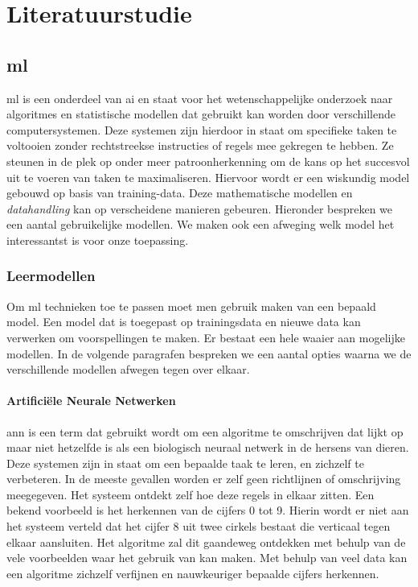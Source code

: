 \chapter{Literatuurstudie}

\section{\gls{ml}}
\gls{ml} is een onderdeel van \gls{ai} en staat voor het wetenschappelijke onderzoek naar algoritmes en statistische modellen dat gebruikt kan worden door verschillende computersystemen. Deze systemen zijn hierdoor in staat om specifieke taken te voltooien zonder rechtstreekse instructies of regels mee gekregen te hebben. Ze steunen in de plek op onder meer patroonherkenning om de kans op het succesvol uit te voeren van taken te maximaliseren. Hiervoor wordt er een wiskundig model gebouwd op basis van training-data. Deze mathematische modellen en \textit{datahandling} kan op verscheidene manieren gebeuren. Hieronder bespreken we een aantal gebruikelijke modellen. We maken ook een afweging welk model het interessantst is voor onze toepassing. 

\subsection{Leermodellen}
Om \gls{ml} technieken toe te passen moet men gebruik maken van een bepaald model. Een model dat is toegepast op trainingsdata en nieuwe data kan verwerken om voorspellingen te maken. Er bestaat een hele waaier aan mogelijke modellen. In de volgende paragrafen bespreken we een aantal opties waarna we de verschillende modellen afwegen tegen over elkaar.

	\subsubsection{Artifici\"ele Neurale Netwerken}
	\gls{ann} is een term dat gebruikt wordt om een algoritme te omschrijven dat lijkt op maar niet hetzelfde is als een biologisch neuraal netwerk in de hersens van dieren. Deze systemen zijn in staat om een bepaalde taak te leren, en zichzelf te verbeteren. In de meeste gevallen worden er zelf geen richtlijnen of omschrijving meegegeven. Het systeem ontdekt zelf hoe deze regels in elkaar zitten. Een bekend voorbeeld is het herkennen van de cijfers 0 tot 9. Hierin wordt er niet aan het systeem verteld dat het cijfer 8 uit twee cirkels bestaat die verticaal tegen elkaar aansluiten. Het algoritme zal dit gaandeweg ontdekken met behulp van de vele voorbeelden waar het gebruik van kan maken. Met behulp van veel data kan een algoritme zichzelf verfijnen en nauwkeuriger bepaalde cijfers herkennen.
	
